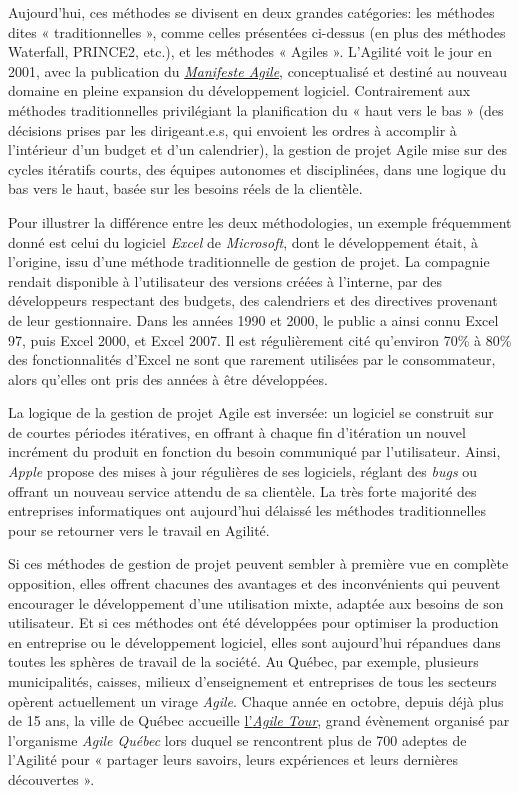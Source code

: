 \documentclass[
  letterpaper,
  DIV=11,
  numbers=noendperiod]{scrreprt}
\begin{document}
Aujourd'hui, ces méthodes se divisent en deux grandes catégories: les
méthodes dites « traditionnelles », comme celles présentées ci-dessus
(en plus des méthodes Waterfall, PRINCE2, etc.), et les méthodes «
Agiles ». L'Agilité voit le jour en 2001, avec la publication du
\href{https://agilemanifesto.org/iso/fr/manifesto.html}{\emph{Manifeste
Agile}}, conceptualisé et destiné au nouveau domaine en pleine expansion
du développement logiciel. Contrairement aux méthodes traditionnelles
privilégiant la planification du « haut vers le bas » (des décisions
prises par les dirigeant.e.s, qui envoient les ordres à accomplir à
l'intérieur d'un budget et d'un calendrier), la gestion de projet Agile
mise sur des cycles itératifs courts, des équipes autonomes et
disciplinées, dans une logique du bas vers le haut, basée sur les
besoins réels de la clientèle.

Pour illustrer la différence entre les deux méthodologies, un exemple
fréquemment donné est celui du logiciel \emph{Excel} de
\emph{Microsoft}, dont le développement était, à l'origine, issu d'une
méthode traditionnelle de gestion de projet. La compagnie rendait
disponible à l'utilisateur des versions créées à l'interne, par des
développeurs respectant des budgets, des calendriers et des directives
provenant de leur gestionnaire. Dans les années 1990 et 2000, le public
a ainsi connu Excel 97, puis Excel 2000, et Excel 2007. Il est
régulièrement cité qu'environ 70\% à 80\% des fonctionnalités d'Excel ne
sont que rarement utilisées par le consommateur, alors qu'elles ont pris
des années à être développées.

La logique de la gestion de projet Agile est inversée: un logiciel se
construit sur de courtes périodes itératives, en offrant à chaque fin
d'itération un nouvel incrément du produit en fonction du besoin
communiqué par l'utilisateur. Ainsi, \emph{Apple} propose des mises à
jour régulières de ses logiciels, réglant des \emph{bugs} ou offrant un
nouveau service attendu de sa clientèle. La très forte majorité des
entreprises informatiques ont aujourd'hui délaissé les méthodes
traditionnelles pour se retourner vers le travail en Agilité.

Si ces méthodes de gestion de projet peuvent sembler à première vue en
complète opposition, elles offrent chacunes des avantages et des
inconvénients qui peuvent encourager le développement d'une utilisation
mixte, adaptée aux besoins de son utilisateur. Et si ces méthodes ont
été développées pour optimiser la production en entreprise ou le
développement logiciel, elles sont aujourd'hui répandues dans toutes les
sphères de travail de la société. Au Québec, par exemple, plusieurs
municipalités, caisses, milieux d'enseignement et entreprises de tous
les secteurs opèrent actuellement un virage \emph{Agile}. Chaque année
en octobre, depuis déjà plus de 15 ans, la ville de Québec accueille
\href{https://www.agilequebec.ca/fr/}{l'\emph{Agile Tour}}, grand
évènement organisé par l'organisme \emph{Agile Québec} lors duquel se
rencontrent plus de 700 adeptes de l'Agilité pour « partager leurs
savoirs, leurs expériences et leurs dernières découvertes ».
\end{document}
